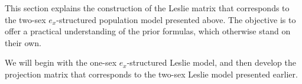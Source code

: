 
This section explains the construction of the Leslie matrix that corresponds to
the two-sex $e_x$-structured population model presented above. The objective is
to offer a practical understanding of the prior formulas, which otherwise stand
on their own. 

We will begin with the one-sex $e_x$-structured Leslie model, and then develop
the projection matrix that corresponds to the two-sex Leslie model presented
earlier.







